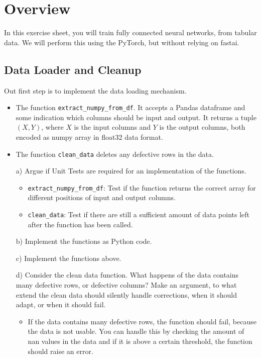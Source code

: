 \documentclass{article}
\begin{document}
\thispagestyle{page1} 

\section{Overview}

In this exercise sheet, you will train fully connected neural networks, from tabular data. We will perform this using the PyTorch, but without relying on fastai.

\subsection{Data Loader and Cleanup}

Out first step is to implement the data loading mechanism.

\begin{itemize}
\item The function \texttt{extract\_numpy\_from\_df}. It accepts a Pandas dataframe and some indication which columns should be input and output. It returns a tuple $(X,Y)$, where $X$ is the input columns and $Y$ is the output columns, both encoded as numpy array in float32 data format. 
\item The function \texttt{clean\_data} deletes any defective rows in the data.
\end{itemize}

\begin{enumerate}

\item[a)] Argue if Unit Tests are required for an implementation of the functions.
\begin{itemize}
    \item \texttt{extract\_numpy\_from\_df}: Test if the function returns the correct array for different positions of input and output columns.
    \item \texttt{clean\_data}: Test if there are still a sufficient amount of data points left after the function has been called.
\end{itemize}

\item[b)] Implement the functions as Python code.

\item[c)] Implement the functions above. 

\item[d)] Consider the clean data function. What happens of the data contains many defective rows, or defective columns? Make an argument, to what extend the clean data should silently handle corrections, when it should adapt, or when it should fail.
\begin{itemize}
    \item If the data contains many defective rows, the function should fail, because the data is not usable. You can handle this by checking the amount of nan values in the data and if it is above a certain threshold, the function should raise an error.
\end{itemize}

\end{enumerate}
\end{document}
